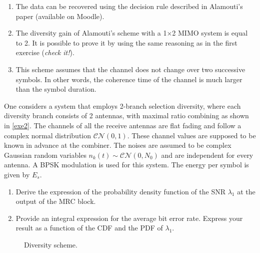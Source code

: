 \documentclass [a4paper, 11pt] {article}
\begin{document}
\begin{solution}
\begin{enumerate}
    \item The data can be recovered using the decision rule described in Alamouti's paper (available on Moodle).
    \item The diversity gain of Alamouti's scheme with a 1$\times$2 MIMO system is equal to 2. It is possible to prove it by using the same reasoning as in the first exercise (\textit{check it!}).
    \item This scheme assumes that the channel does not change over two successive symbols. In other words, the coherence time of the channel is much larger than the symbol duration.
\end{enumerate}

    \end{solution}

    \begin{exercise}{5}
        One considers a system that employs 2-branch selection diversity, where each diversity branch consists of 2 antennas, with maximal ratio combining as shown in \autoref{exe2}. The channels of all the receive antennas are flat fading and follow a complex normal distribution $\mathcal{C}\mathcal{N}(0,1)$. These channel values are supposed to be known in advance at the combiner. The noises are assumed to be complex Gaussian random variables $n_k(t) \sim \mathcal{C}\mathcal{N}(0,N_0)$ and are independent for every antenna. A BPSK modulation is used for this system. The energy per symbol is given by $E_s$.

        \begin{enumerate}
            \item Derive the expression of the probability density function of the SNR $\lambda_1$ at the output of the MRC block.
            \item Provide an integral expression for the average bit error rate. Express your result as a function of the CDF and the PDF of $\lambda_1$.
        \end{enumerate}

        \begin{figure}[H]
            \centering
            
            \caption{Diversity scheme.}
            \label{exe2}
            \end{figure}
    \end{exercise}
\end{document}
